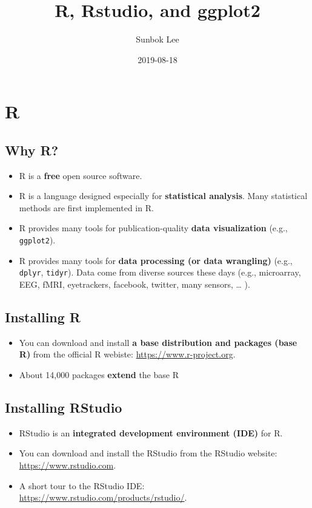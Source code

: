 \documentclass[]{book}
\title{R, Rstudio, and ggplot2}
\author{Sunbok Lee}
\date{2019-08-18}
\providecommand{\tightlist}{%
  \setlength{\itemsep}{0pt}\setlength{\parskip}{0pt}}
\begin{document}
\maketitle

{
\setcounter{tocdepth}{1}
\tableofcontents
}
\chapter{R}\label{r}

\section{Why R?}\label{why-r}

\begin{itemize}
\tightlist
\item
  R is a \textbf{free} open source software.
\item
  R is a language designed especially for \textbf{statistical analysis}.
  Many statistical methods are first implemented in R.
\item
  R provides many tools for publication-quality \textbf{data
  visualization} (e.g., \texttt{ggplot2}).
\item
  R provides many tools for \textbf{data processing (or data wrangling)}
  (e.g., \texttt{dplyr}, \texttt{tidyr}). Data come from diverse sources
  these days (e.g., microarray, EEG, fMRI, eyetrackers, facebook,
  twitter, many sensors, \ldots{} ).
\end{itemize}

\section{Installing R}\label{installing-r}

\begin{itemize}
\item
  You can download and install \textbf{a base distribution and packages
  (base R)} from the official R webiste:
  \url{https://www.r-project.org}.
\item
  About 14,000 packages \textbf{extend} the base R
\end{itemize}

\section{Installing RStudio}\label{installing-rstudio}

\begin{itemize}
\item
  RStudio is an \textbf{integrated development environment (IDE)} for R.
\item
  You can download and install the RStudio from the RStudio website:
  \url{https://www.rstudio.com}.
\item
  A short tour to the RStudio IDE:
  \url{https://www.rstudio.com/products/rstudio/}.
\end{itemize}
\end{document}

